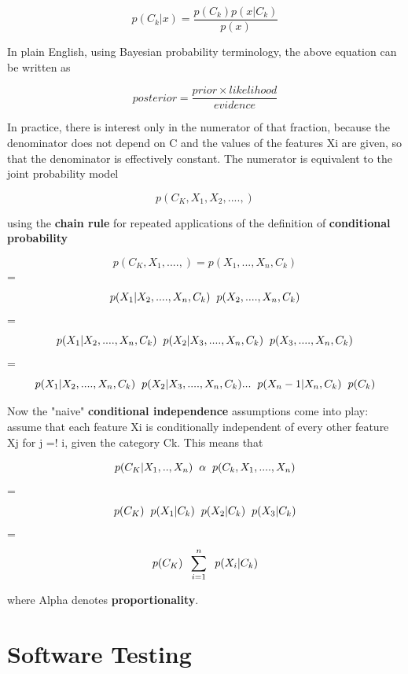 \documentclass[oneside,a4paper,12pt]{book}
\begin{document}
\[p {(C_k | x)} =\frac{p{(C_k)}p{(x|C_k)}}{p(x)}\] \newline

In plain English, using Bayesian probability terminology, the above equation can be written as \newline
 
\[ posterior =\frac{prior \times likelihood}{evidence}\]

In practice, there is interest only in the numerator of that fraction, because the denominator does not depend on C and the values of the features Xi are given, so that the denominator is effectively constant. The numerator is equivalent to the joint probability model

\[p ({C_K, X_1,X_2,....,})\]

using the \textbf{chain rule} for repeated applications of the definition of \textbf{conditional probability}

\[p ({C_K, X_1,....,}) = p ({X_1,...,X_n,C_k})\]
= \[p({X_1|X_2,....,X_n,C_k})\hspace{2mm}p(X_2,....,X_n,C_k)\]
=\[p({X_1|X_2,....,X_n,C_k})\hspace{2mm}p({X_2|X_3,....,X_n,C_k})\hspace{2mm}p(X_3,....,X_n,C_k)\]
=\[p({X_1|X_2,....,X_n,C_k})\hspace{2mm}p({X_2|X_3,....,X_n,C_k})...\hspace{2mm}p({X_n-1|X_n,C_k})\hspace{2mm}p(C_k)\]

Now the "naive" \textbf{conditional independence} assumptions come into play: assume that each feature Xi is conditionally independent of every other feature Xj for j =! i, given the category Ck. This means that

\[p ({C_K| X_1,..,X_n})\hspace{2mm} \alpha \hspace{2mm}p({C_k,X_1,....,X_n})\]
=\[p ({C_K}) \hspace{2mm}p{(X_1|C_k)} \hspace{2mm}p{(X_2|C_k)}\hspace{2mm} p{(X_3|C_k)}\]
=\[p ({C_K}) \hspace{2mm}\sum\limits_{i=1}^n \hspace{2mm}p(X_i|C_k)\]

where Alpha denotes \textbf{proportionality}.
\chapter{Software Testing}
\end{document}
